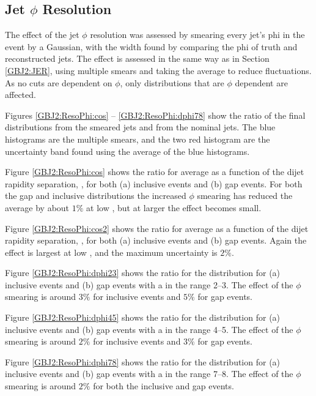 \subsection{Jet $\phi{}$ Resolution}
\label{GBJ2:JPhiR}

The effect of the jet $\phi$ resolution was assessed by smearing every jet's phi in the event by a Gaussian, with the width found by comparing the phi of truth and reconstructed jets. 
The effect is assessed in the same way as in Section \ref{GBJ2:JER}, using multiple smears and taking the average to reduce fluctuations. 
As no cuts are dependent on $\phi$, only distributions that are $\phi$ dependent are affected.

Figures \ref{GBJ2:ResoPhi:cos} -- \ref{GBJ2:ResoPhi:dphi78} show the ratio of the final distributions from the smeared jets and from the nominal jets.
The blue histograms are the multiple smears, and the two red histogram are the uncertainty band found using the average of the blue histograms.  

Figure \ref{GBJ2:ResoPhi:cos} shows the ratio for average \cosdphi{} as a function of the dijet rapidity separation, \dy{}, for both (a) inclusive events and (b) gap events.
For both the gap and inclusive distributions the increased $\phi$ smearing has reduced the average \cosdphi{} by about $1\%$ at low \dy{}, but at larger \dy{} the effect becomes small.

Figure \ref{GBJ2:ResoPhi:cos2} shows the ratio for average \costwodphi{} as a function of the dijet rapidity separation, \dy{}, for both (a) inclusive events and (b) gap events.
Again the effect is largest at low \dy{}, and the maximum uncertainty is  $2\%$. 

Figure \ref{GBJ2:ResoPhi:dphi23} shows the ratio for the \dphi{} distribution for (a) inclusive events and (b) gap events with a \dy{} in the range 2--3.
The effect of the $\phi$ smearing is around  $3\%$ for inclusive events and  $5\%$ for gap events.

Figure \ref{GBJ2:ResoPhi:dphi45} shows the ratio for the \dphi{} distribution for (a) inclusive events and (b) gap events with a \dy{} in the range 4--5.
The effect of the $\phi$ smearing is around  $2\%$ for inclusive events and  $3\%$ for gap events.

Figure \ref{GBJ2:ResoPhi:dphi78} shows the ratio for the \dphi{} distribution for (a) inclusive events and (b) gap events with a \dy{} in the range 7--8.
The effect of the $\phi$ smearing is around  $2\%$ for both the inclusive and gap events.

